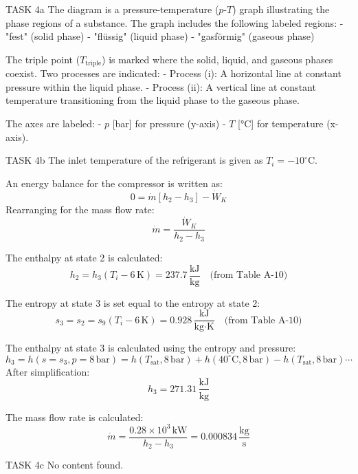 TASK 4a  
The diagram is a pressure-temperature (\( p \)-\( T \)) graph illustrating the phase regions of a substance. The graph includes the following labeled regions:  
- "fest" (solid phase)  
- "flüssig" (liquid phase)  
- "gasförmig" (gaseous phase)  

The triple point (\( T_{\text{triple}} \)) is marked where the solid, liquid, and gaseous phases coexist. Two processes are indicated:  
- Process (i): A horizontal line at constant pressure within the liquid phase.  
- Process (ii): A vertical line at constant temperature transitioning from the liquid phase to the gaseous phase.  

The axes are labeled:  
- \( p \) [bar] for pressure (y-axis)  
- \( T \) [°C] for temperature (x-axis).  

TASK 4b  
The inlet temperature of the refrigerant is given as \( T_i = -10^\circ\text{C} \).  

An energy balance for the compressor is written as:  
\[
0 = \dot{m} [h_2 - h_3] - \dot{W}_K
\]  
Rearranging for the mass flow rate:  
\[
\dot{m} = \frac{\dot{W}_K}{h_2 - h_3}
\]  

The enthalpy at state 2 is calculated:  
\[
h_2 = h_3(T_i - 6 \, \text{K}) = 237.7 \, \frac{\text{kJ}}{\text{kg}} \quad \text{(from Table A-10)}
\]  

The entropy at state 3 is set equal to the entropy at state 2:  
\[
s_3 = s_2 = s_9(T_i - 6 \, \text{K}) = 0.928 \, \frac{\text{kJ}}{\text{kg·K}} \quad \text{(from Table A-10)}
\]  

The enthalpy at state 3 is calculated using the entropy and pressure:  
\[
h_3 = h(s = s_3, p = 8 \, \text{bar}) = h(T_{\text{sat}}, 8 \, \text{bar}) + h(40^\circ\text{C}, 8 \, \text{bar}) - h(T_{\text{sat}}, 8 \, \text{bar}) \cdots
\]  
After simplification:  
\[
h_3 = 271.31 \, \frac{\text{kJ}}{\text{kg}}
\]  

The mass flow rate is calculated:  
\[
\dot{m} = \frac{0.28 \times 10^3 \, \text{kW}}{h_2 - h_3} = 0.000834 \, \frac{\text{kg}}{\text{s}}
\]  

TASK 4c  
No content found.